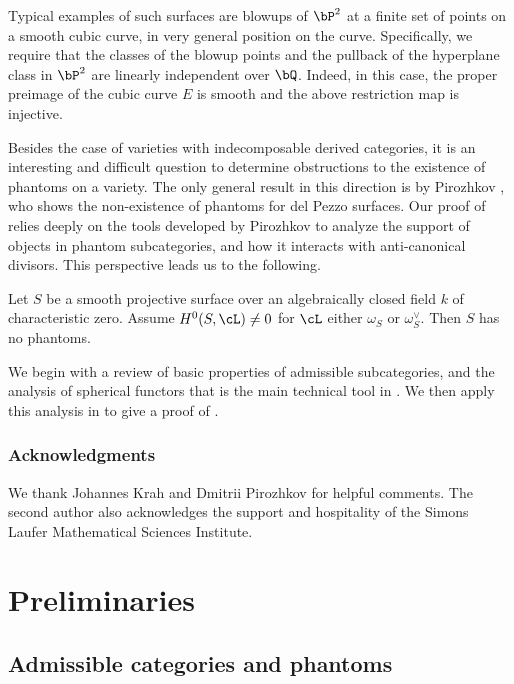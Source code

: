 \begin{rem}
Typical examples of such surfaces are blowups of $\bP^2$ at a finite set of points on a smooth cubic curve, in very general position on the curve. Specifically, we require that the classes of the blowup points and the pullback of the hyperplane class in $\bP^2$ are linearly independent over $\bQ$. Indeed, in this case, the proper preimage of the cubic curve $E$ is smooth and the above restriction map is injective. 
\end{rem} 

Besides the case of varieties with indecomposable derived categories, it is an interesting and difficult question to determine obstructions to the existence of phantoms on a variety. The only general result in this direction is by Pirozhkov \cite{P23}, who shows the non-existence of phantoms for del Pezzo surfaces. Our proof of  relies deeply on the tools developed by Pirozhkov to analyze the support of objects in phantom subcategories, and how it interacts with anti-canonical divisors. This perspective leads us to the following.

\begin{conj}
Let $S$ be a smooth projective surface over an algebraically closed field $k$ of characteristic zero. Assume $H^0(S,\cL) \neq 0$ for $\cL$ either $\omega_S$ or $\omega_S^\vee$. Then $S$ has no phantoms.
\end{conj}

We begin  with a review of basic properties of admissible subcategories, and the analysis of spherical functors that is the main technical tool in \cite{P23}. We then apply this analysis in  to give a proof of . 

\subsubsection*{Acknowledgments} We thank Johannes Krah and Dmitrii Pirozhkov for helpful comments. The second author also acknowledges the support and hospitality of the Simons Laufer Mathematical Sciences Institute. 

\section{Preliminaries}\label{S:prelims}

\subsection{Admissible categories and phantoms}

